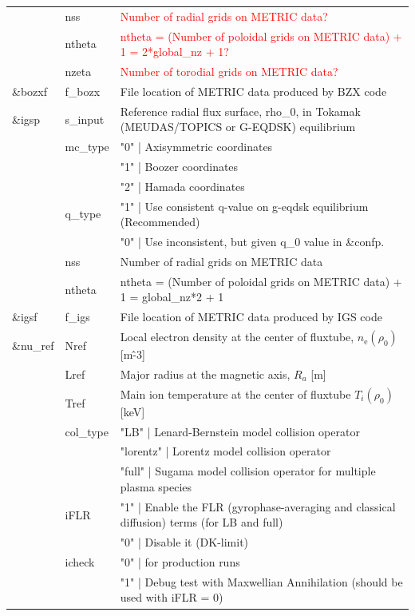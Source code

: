 \begin{longtable}{ l | l | p{10cm} }
               \cline{2-3}
             ~ & nss & \textcolor{red}{Number of radial grids on METRIC data?}\\
               \cline{2-3}
             ~ & ntheta & \textcolor{red}{ntheta = (Number of poloidal grids on METRIC data) + 1 = 2*global\_nz + 1?}\\
               \cline{2-3}
             ~ & nzeta & \textcolor{red}{Number of torodial grids on METRIC data?}\\
            \cline{2-3}
  \&bozxf & f\_bozx & File location of METRIC data produced by BZX code\\
  \hline
  \&igsp & s\_input & Reference radial flux surface, rho\_0, in Tokamak (MEUDAS/TOPICS or G-EQDSK) equilibrium\\
            \cline{2-3}
         ~ & mc\_type & "0" | Axisymmetric coordinates\\
         ~ &            ~ & "1" | Boozer coordinates\\
         ~ &            ~ & "2" | Hamada coordinates\\
            \cline{2-3}
         ~ & q\_type & "1" | Use consistent q-value on g-eqdsk equilibrium (Recommended)\\
         ~ &          ~ & "0" | Use inconsistent, but given q\_0 value in \&confp.\\
            \cline{2-3}
         ~ & nss & Number of radial grids on METRIC data\\
            \cline{2-3}
         ~ & ntheta & ntheta = (Number of poloidal grids on METRIC data) + 1 = global\_nz*2 + 1\\
            \cline{2-3}
  \&igsf & f\_igs & File location of METRIC data produced by IGS code\\
  \hline
  \&nu\_ref & Nref & Local electron density at the center of fluxtube, $n_\mathrm{e}(\rho_0)$ [m\^-3]\\
                \cline{2-3}
              ~ & Lref & Major radius at the magnetic axis, $R_a$ [m]\\
                \cline{2-3}
              ~ & Tref & Main ion temperature at the center of fluxtube $T_i(\rho_0)$ [keV]\\
                \cline{2-3}
              ~ & col\_type & "LB" | Lenard-Bernstein model collision operator\\
              ~ &            ~ & "lorentz" | Lorentz model collision operator\\
              ~ &            ~ & "full" | Sugama model collision operator for multiple plasma species\\
                \cline{2-3}
              ~ & iFLR & "1" | Enable the FLR (gyrophase-averaging and classical diffusion) terms (for LB and full)\\
              ~ &      ~ & "0" | Disable it (DK-limit)\\
                \cline{2-3}
              ~ & icheck & "0" | for production runs\\
              ~ &        ~ & "1" | Debug test with Maxwellian Annihilation (should be used with iFLR = 0)\\
\end{longtable}


